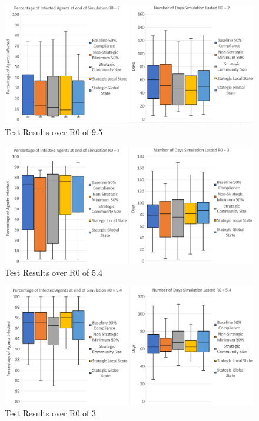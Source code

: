 \documentclass{article}
\begin{document}
\newpage

\begin{figure}
  \centering
      \includegraphics[width=\textwidth]{5}
  \caption{Test Results over R0 of 9.5}
\end{figure}

\begin{figure}
  \centering
      \includegraphics[width=\textwidth]{4}
  \caption{Test Results over R0 of 5.4}
\end{figure}

\begin{figure}
  \centering
      \includegraphics[width=\textwidth]{3}
  \caption{Test Results over R0 of 3}
\end{figure}
\end{document}
